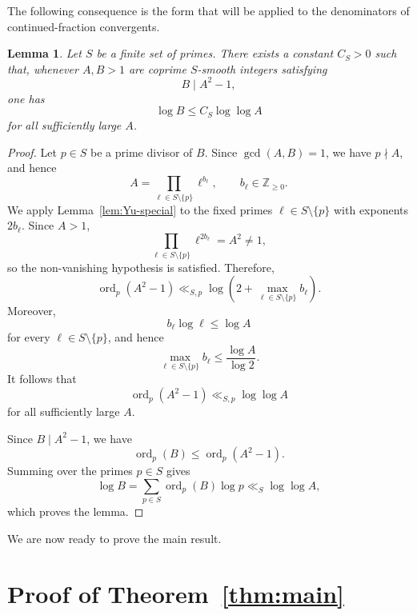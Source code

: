 \documentclass[11pt]{amsart}
\newtheorem{lemma}[theorem]{Lemma}
\theoremstyle{remark}
\newcommand{\Z}{\mathbb Z}
\DeclareMathOperator{\ord}{ord}
\begin{document}
The following consequence is the form that will be applied to the
denominators of continued-fraction convergents.

\begin{lemma}\label{lem:smooth-congruence}
Let $S$ be a finite set of primes. There exists a constant $C_S>0$
such that, whenever $A,B>1$ are coprime $S$-smooth integers satisfying
\begin{equation}\label{eq:divides-abstract}
 B\mid A^2-1,
\end{equation}
one has
\begin{equation}\label{eq:smooth-congruence}
 \log B\le C_S\log\log A
\end{equation}
for all sufficiently large $A$.
\end{lemma}

\begin{proof}
Let $p\in S$ be a prime divisor of $B$. Since $\gcd(A,B)=1$, we have
$p\nmid A$, and hence
\[
 A=\prod_{\ell\in S\setminus\{p\}}\ell^{b_\ell},
 \qquad b_\ell\in\Z_{\ge0}.
\]
We apply Lemma~\ref{lem:Yu-special} to the fixed primes
$\ell\in S\setminus\{p\}$ with exponents $2b_\ell$. Since $A>1$,
\[
 \prod_{\ell\in S\setminus\{p\}}\ell^{2b_\ell}
 =A^2\ne1,
\]
so the non-vanishing hypothesis is satisfied. Therefore,
\begin{equation}\label{eq:Yu-use}
 \ord_p(A^2-1)
 \ll_{S,p}
 \log\left(
 2+\max_{\ell\in S\setminus\{p\}} b_\ell
 \right).
\end{equation}
Moreover,
\[
 b_\ell\log\ell\le\log A
\]
for every $\ell\in S\setminus\{p\}$, and hence
\[
 \max_{\ell\in S\setminus\{p\}}b_\ell
 \le \frac{\log A}{\log2}.
\]
It follows that
\begin{equation}\label{eq:vp-loglog}
 \ord_p(A^2-1)\ll_{S,p}\log\log A
\end{equation}
for all sufficiently large $A$.

Since $B\mid A^2-1$, we have
\[
 \ord_p(B)\le \ord_p(A^2-1).
\]
Summing over the primes $p\in S$ gives
\[
 \log B
 =\sum_{p\in S}\ord_p(B)\log p
 \ll_S\log\log A,
\]
which proves the lemma.
\end{proof}


We are now ready to prove the main result.


\section{Proof of Theorem~\ref{thm:main}}
\end{document}
